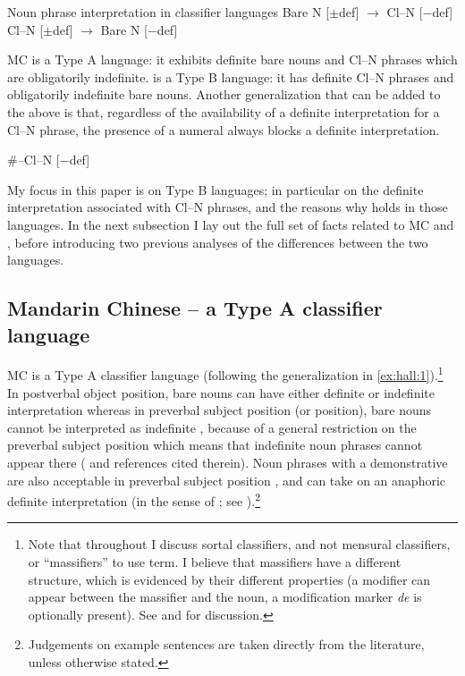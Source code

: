 \documentclass[output=paper
,modfonts
,nonflat]{langsci/langscibook}
\begin{document}
\ea \label{ex:hall:1}
Noun phrase interpretation in classifier languages
\ea Bare N [$\pm$def] $\rightarrow$ Cl--N [$-$def] 
\ex Cl--N [$\pm$def] $\rightarrow$ Bare N [$-$def] 
\z
\z

MC is a Type A language: it exhibits definite bare nouns and Cl--N phrases which are obligatorily indefinite.  is a Type B language: it has definite Cl--N phrases and obligatorily indefinite bare nouns.
Another generalization that can be added to the above is that, regardless of the availability of a definite interpretation for a Cl--N phrase, the presence of a numeral always blocks a definite interpretation.

\ea \label{ex:hall:2}
\#--Cl--N [$-$def]  
\z

My focus in this paper is on Type B languages; in particular on the definite interpretation associated with Cl--N phrases, and the reasons why  holds in those languages. In the next subsection I lay out the full set of facts related to MC and , before introducing two previous analyses of the differences between the two languages.

\subsection{Mandarin Chinese -- a Type A classifier language} 

MC is a Type A classifier language (following the generalization in \ref{ex:hall:1}).\footnote{Note that throughout I discuss sortal classifiers, and not mensural classifiers, or ``massifiers'' to use  term. I believe that massifiers have a different structure, which is evidenced by their different properties (a modifier can appear between the massifier and the noun, a modification marker \textit{de} is optionally present). See \citet{ChengSybesma1998} and \citet{ChengSybesma1999} for discussion.} In postverbal object position, bare nouns can have either definite or indefinite interpretation whereas in preverbal subject position (or  position), bare nouns cannot be interpreted as indefinite , because of a general restriction on the preverbal subject position which means that indefinite noun phrases cannot appear there (\citealt[288]{HuangEtAlii2009} and references cited therein). Noun phrases with a demonstrative are also acceptable in preverbal subject position , and can take on an anaphoric definite interpretation (in the sense of \citealt{Schwarz2009}; see \citealt{Jenks2015}).\footnote{Judgements on example sentences are taken directly from the literature, unless otherwise stated.}
\end{document}
